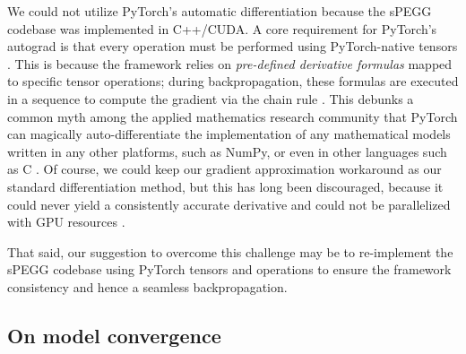 \documentclass[12pt]{article}
\begin{document}
We could not utilize PyTorch's automatic differentiation because the sPEGG codebase was implemented in C++/CUDA. A core requirement for PyTorch's autograd is that every operation must be performed using PyTorch-native tensors \cite{paszke2017automatic}. This is because the framework relies on \emph{pre-defined derivative formulas} mapped to specific tensor operations; during backpropagation, these formulas are executed in a sequence to compute the gradient via the chain rule \cite{paszke2017automatic}. This debunks a common myth among the applied mathematics research community that PyTorch can magically auto-differentiate the implementation of any mathematical models written in any other platforms, such as NumPy, or even in other languages such as C \cite{paszke2017automatic}. Of course, we could keep our gradient approximation workaround as our standard differentiation method, but this has long been discouraged, because it could never yield a consistently accurate derivative and could not be parallelized with GPU resources \cite{thgaskin2023neural}.

That said, our suggestion to overcome this challenge may be to re-implement the sPEGG codebase using PyTorch tensors and operations to ensure the framework consistency and hence a seamless backpropagation.

\subsection{On model convergence} %
\end{document}
